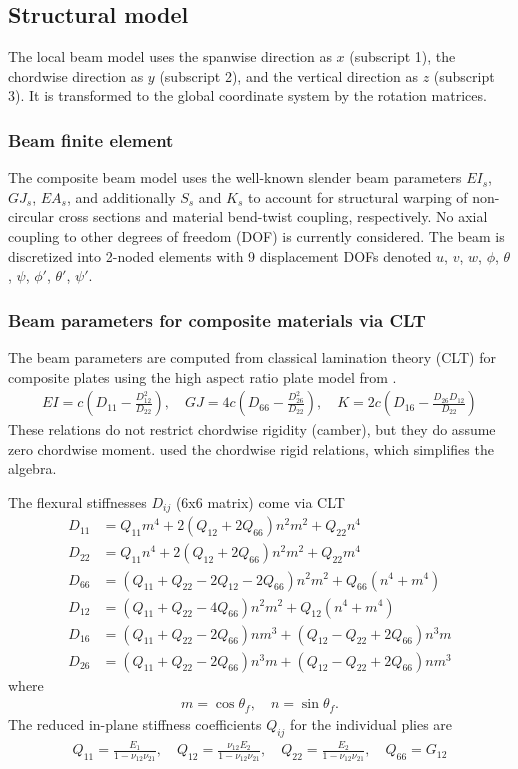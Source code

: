 \documentclass[10pt]{article}
\newcommand{\be}{\begin{eqnarray}}
\newcommand{\ee}{\end{eqnarray}}
\begin{document}
\subsection{Structural model}
% 
The local beam model uses the spanwise direction as $x$ (subscript 1), the chordwise direction as $y$ (subscript 2), and the vertical direction as $z$ (subscript 3).
It is transformed to the global coordinate system by the rotation matrices.
\subsubsection{Beam finite element}
% 
The composite beam model uses the well-known slender beam parameters $EI_s$, $GJ_s$, $EA_s$, and additionally $S_s$ and $K_s$ to account for structural warping of non-circular cross sections and material bend-twist coupling, respectively.
No axial coupling to other degrees of freedom (DOF) is currently considered.
The beam is discretized into 2-noded elements with 9 displacement DOFs denoted $u$, $v$, $w$, $\phi$, $\theta$, $\psi$, $\phi'$, $\theta'$, $\psi'$.
% 
\subsubsection{Beam parameters for composite materials via CLT}
% 
The beam parameters are computed from classical lamination theory (CLT) for composite plates using the high aspect ratio plate model from \citet{Weisshaar1985}.
\be
EI = c\left( D_{11} - \frac{D_{12}^2}{D_{22}}\right)      , \quad
GJ = 4c \left(D_{66} - \frac{D_{26}^2}{D_{22}}\right)     , \quad
K  = 2c \left(D_{16} - \frac{D_{26}D_{12}}{D_{22}}\right)
\ee
These relations do not restrict chordwise rigidity (camber), but they do assume zero chordwise moment.
\citet{LOTTATI1985} used the chordwise rigid relations, which simplifies the algebra.

The flexural stiffnesses $D_{ij}$ (6x6 matrix) come via CLT
\begin{align}
	D_{11} & = Q_{11}m^4 + 2\left( Q_{12}+2Q_{66}\right)n^2m^2 + Q_{22}n^4                               \\
	D_{22} & = Q_{11}n^4+2\left( Q_{12} + 2Q_{66}\right)n^2m^2 + Q_{22}m^4                               \\
	D_{66} & = \left(Q_{11} +Q_{22} - 2Q_{12}-2Q_{66}\right)n^2m^2 + Q_{66}\left( n^4 + m^4 \right)      \\
	D_{12} & = \left(Q_{11} +Q_{22} - 4Q_{66}\right)n^2 m^2 + Q_{12}\left( n^4 + m^4 \right)             \\
	D_{16} & = \left(Q_{11} +Q_{22} - 2Q_{66}\right)n m^3 + \left(Q_{12} - Q_{22} + 2Q_{66}\right) n^3 m \\
	D_{26} & = \left(Q_{11} +Q_{22} - 2Q_{66}\right)n^3 m + \left(Q_{12} - Q_{22} + 2Q_{66}\right) n m^3
\end{align}
where
\be
m= \cos\theta_f,
\quad
n= \sin\theta_f.
\ee
%
The reduced in-plane stiffness coefficients $Q_{ij}$ for the individual plies are
%
\be
Q_{11} = \frac{E_1}{1-\nu_{12}\nu_{21}}, \quad
Q_{12} = \frac{\nu_{12} E_2}{1-\nu_{12}\nu_{21}}, \quad
Q_{22} = \frac{E_2}{1-\nu_{12}\nu_{21}}, \quad
Q_{66} = G_{12}
\ee
\end{document}
